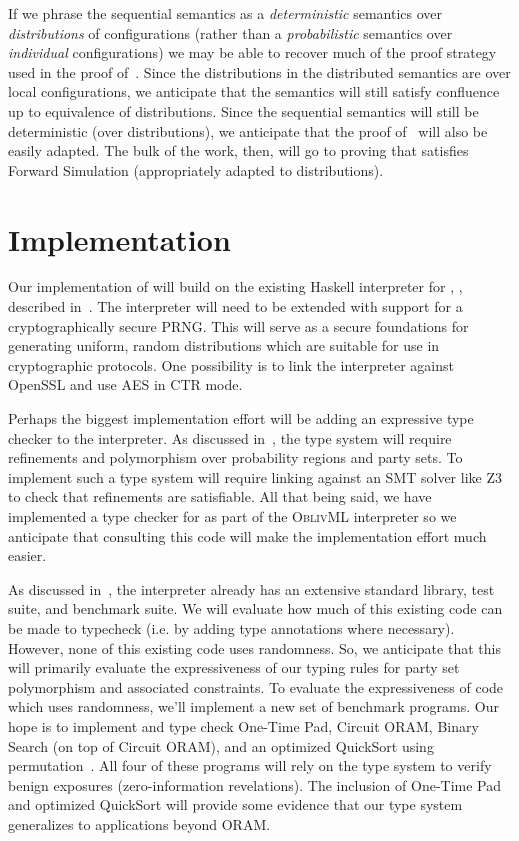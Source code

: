 If we phrase the sequential semantics as a \emph{deterministic} semantics over \emph{distributions} of configurations
(rather than a \emph{probabilistic} semantics over \emph{individual} configurations) we may be able to recover much
of the proof strategy used in the proof of~. Since the distributions in the distributed
semantics are over local configurations, we anticipate that the semantics will still satisfy confluence up to equivalence
of distributions. Since the sequential semantics will still be deterministic (over distributions), we anticipate that the
proof of~ will also be easily adapted. The bulk of the work, then, will go to proving that
\lang satisfies Forward Simulation (appropriately adapted to distributions).

\section{Implementation}
\label{sec:proposal-impl}

Our implementation of \lang will build on the existing Haskell interpreter for \mpc, \system, described in~.
The interpreter will need to be extended with support for a cryptographically secure PRNG. This will serve as a secure foundations for
generating uniform, random distributions which are suitable for use in cryptographic protocols. One possibility is to link the interpreter
against OpenSSL and use AES in CTR mode.

Perhaps the biggest implementation effort will be adding an expressive type checker to the interpreter. As discussed
in~, the type system will require refinements and polymorphism over probability regions and party sets.
To implement such a type system will require linking against an SMT solver like Z3~\cite{10.5555/1792734.1792766} to check that
refinements are satisfiable. All that being said, we have implemented a type checker for \obliv as part of the \textsc{OblivML} interpreter
so we anticipate that consulting this code will make the implementation effort much easier.

As discussed in~, the \system interpreter already has an extensive standard library, test suite, and benchmark
suite. We will evaluate how much of this existing \system code can be made to typecheck (i.e. by adding type annotations where necessary).
However, none of this existing code uses randomness. So, we anticipate that this will primarily evaluate the expressiveness of our
typing rules for party set polymorphism and associated constraints. To evaluate the expressiveness of code which uses randomness,
we'll implement a new set of benchmark programs. Our hope is to implement and type check One-Time Pad, Circuit ORAM,
Binary Search (on top of Circuit ORAM), and an optimized QuickSort using permutation~\cite{obliv-quicksort}. All four of these programs
will rely on the type system to verify benign exposures (zero-information revelations). The inclusion of One-Time Pad and
optimized QuickSort will provide some evidence that our type system generalizes to applications beyond ORAM.

